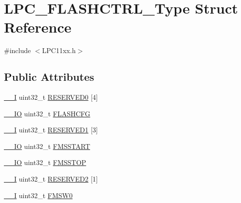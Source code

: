 \hypertarget{struct_l_p_c___f_l_a_s_h_c_t_r_l___type}{}\section{L\+P\+C\+\_\+\+F\+L\+A\+S\+H\+C\+T\+R\+L\+\_\+\+Type Struct Reference}
\label{struct_l_p_c___f_l_a_s_h_c_t_r_l___type}


{\ttfamily \#include $<$L\+P\+C11xx.\+h$>$}

\subsection*{Public Attributes}
\begin{DoxyCompactItemize}
\item 
\hyperlink{group___c_m_s_i_s__core__definitions_gaf63697ed9952cc71e1225efe205f6cd3}{\+\_\+\+\_\+I} uint32\+\_\+t \hyperlink{group___l_p_c11xx___definitions_ga1e76ff992a53b6f0d322ba31ceed23a1}{R\+E\+S\+E\+R\+V\+E\+D0} \mbox{[}4\mbox{]}
\item 
\hyperlink{group___c_m_s_i_s__core__definitions_gaec43007d9998a0a0e01faede4133d6be}{\+\_\+\+\_\+\+IO} uint32\+\_\+t \hyperlink{group___l_p_c11xx___definitions_ga935218d47a7a49f946adf9eab4c879f8}{F\+L\+A\+S\+H\+C\+FG}
\item 
\hyperlink{group___c_m_s_i_s__core__definitions_gaf63697ed9952cc71e1225efe205f6cd3}{\+\_\+\+\_\+I} uint32\+\_\+t \hyperlink{group___l_p_c11xx___definitions_ga4c960baaa0123b6be73d4342af7f1f63}{R\+E\+S\+E\+R\+V\+E\+D1} \mbox{[}3\mbox{]}
\item 
\hyperlink{group___c_m_s_i_s__core__definitions_gaec43007d9998a0a0e01faede4133d6be}{\+\_\+\+\_\+\+IO} uint32\+\_\+t \hyperlink{group___l_p_c11xx___definitions_ga3f34045f09782996b016d4d28fc59385}{F\+M\+S\+S\+T\+A\+RT}
\item 
\hyperlink{group___c_m_s_i_s__core__definitions_gaec43007d9998a0a0e01faede4133d6be}{\+\_\+\+\_\+\+IO} uint32\+\_\+t \hyperlink{group___l_p_c11xx___definitions_ga23c075053616e15f2f53435deb3bfcd0}{F\+M\+S\+S\+T\+OP}
\item 
\hyperlink{group___c_m_s_i_s__core__definitions_gaf63697ed9952cc71e1225efe205f6cd3}{\+\_\+\+\_\+I} uint32\+\_\+t \hyperlink{group___l_p_c11xx___definitions_gad8b04a97fcb2700fcf92bdc6ec393047}{R\+E\+S\+E\+R\+V\+E\+D2} \mbox{[}1\mbox{]}
\item 
\hyperlink{group___c_m_s_i_s__core__definitions_gaf63697ed9952cc71e1225efe205f6cd3}{\+\_\+\+\_\+I} uint32\+\_\+t \hyperlink{group___l_p_c11xx___definitions_ga402795c81bfe0d9a3560dd9cfe784ec3}{F\+M\+S\+W0}

\end{DoxyCompactItemize}
